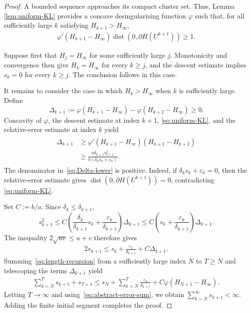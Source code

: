 \documentclass[10pt,a4paper]{amsart}
\DeclareMathOperator{\dist}{dist}
\theoremstyle{plain}
\theoremstyle{definition}
\theoremstyle{remark}
\begin{document}
\begin{proof}
A bounded sequence approaches its compact cluster set. Thus, Lemma \ref{lem:uniform-KL} provides a  concave desingularizing function \(\varphi\) such that, for all sufficiently large \(k\) satisfying
$H_{k+1}>H_\infty$,
\begin{eqnarray}\label{eq:uniform-KL}
 \varphi'(H_{k+1}-H_\infty)
 \dist\!\left(0,\partial H(U^{k+1})\right)\geq1.
\end{eqnarray}

Suppose first that $H_j=H_\infty$ for some sufficiently large $j$.
Monotonicity and convergence then give
$H_k=H_\infty$ for every $k\geq j$, and the descent estimate implies
$s_k=0$ for every $k\geq j$. The conclusion follows in this case.

It remains to consider the case in which $H_k>H_\infty$ when $k$ is sufficiently large. Define
\[
 \Delta_{k+1}:=
 \varphi(H_{k+1}-H_\infty)
 -\varphi(H_{k+2}-H_\infty)\geq0.
\]
Concavity of $\varphi$, the descent estimate at index $k+1$,
\eqref{eq:uniform-KL}, and the relative-error estimate at index $k$
yield
\begin{eqnarray}\label{eq:Delta-lower}
\begin{aligned}
 \Delta_{k+1}
 &\geq\varphi'(H_{k+1}-H_\infty)(H_{k+1}-H_{k+2})\\
 &\geq\frac{a\delta_{k+1}s_{k+1}^2}
 {b(\delta_ks_k+\varepsilon_k)}.
\end{aligned}
\end{eqnarray}
The denominator in~\eqref{eq:Delta-lower} is positive. Indeed, if
$\delta_ks_k+\varepsilon_k=0$, then the relative-error estimate gives
$\dist(0,\partial H(U^{k+1}))=0$, contradicting
\eqref{eq:uniform-KL}.

Set $C:=b/a$. Since $\delta_k\leq\delta_{k+1}$,
$$
 s_{k+1}^2
 \leq C\left(
 \frac{\delta_k}{\delta_{k+1}}s_k
 +\frac{\varepsilon_k}{\delta_{k+1}}\right)\Delta_{k+1}
 \leq C\left(s_k+\frac{\varepsilon_k}{\delta_{k+1}}\right)
 \Delta_{k+1}.$$
The inequality $2\sqrt{uv}\leq u+v$ therefore gives
\begin{eqnarray}\label{eq:length-recursion}
 2s_{k+1}\leq s_k+\frac{\varepsilon_k}{\delta_{k+1}}
 +C\Delta_{k+1}.
\end{eqnarray}
Summing~\eqref{eq:length-recursion} from a sufficiently large index
$N$ to $T\geq N$ and telescoping the terms $\Delta_{k+1}$ yield
\begin{eqnarray*}
 \sum_{k=N}^{T}s_{k+1}+s_{T+1}
 \leq s_N+\sum_{k=N}^{T}\frac{\varepsilon_k}{\delta_{k+1}}
 +C\varphi(H_{N+1}-H_\infty).
\end{eqnarray*}
Letting $T\to\infty$ and using~\eqref{eq:abstract-error-sum}, we obtain
$\sum_{k=N}^{\infty}s_{k+1}<\infty$. Adding the finite initial
segment completes the proof.
\end{proof}
\end{document}
